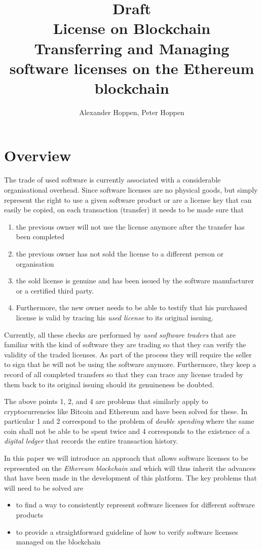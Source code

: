 \documentclass[a4paper]{article}
\title{\textsf{\Huge Draft} \\[3mm] License on Blockchain \\[2mm] \large Transferring and Managing software licenses on the Ethereum blockchain}
\author{Alexander Hoppen, Peter Hoppen}
\begin{document}
\maketitle



\section{Overview}

The trade of used software is currently associated with a considerable organisational overhead. Since software licenses are no physical goods, but simply represent the right to use a given software product or are a license key that can easily be copied, on each transaction (transfer) it needs to be made sure that
\begin{enumerate}
  \item the previous owner will not use the license anymore after the transfer has been completed
  \item the previous owner has not sold the license to a different person or organisation
  \item the sold license is genuine and has been issued by the software manufacturer or a certified third party.
  \item Furthermore, the new owner needs to be able to testify that his purchased license is valid by tracing his \emph{used license} to its original issuing.
\end{enumerate}

Currently, all these checks are performed by \emph{used software traders} that are familiar with the kind of software they are trading so that they can verify the validity of the traded licenses. As part of the process they will require the seller to sign that he will not be using the software anymore. Furthermore, they keep a record of all completed transfers so that they can trace any license traded by them back to its original issuing should its genuineness be doubted. 

The above points 1, 2, and 4 are problems that similarly apply to cryptocurrencies like Bitcoin and Ethereum and have been solved for these. In particular 1 and 2 correspond to the problem of \emph{double spending} where the same coin shall not be able to be spent twice and 4 corresponds to the existence of a \emph{digital ledger} that records the entire transaction history.

In this paper we will introduce an approach that allows software licenses to be represented on the \emph{Ethereum blockchain} and which will thus inherit the advances that have been made in the development of this platform. The key problems that will need to be solved are
\begin{itemize}
  \item to find a way to consistently represent software licenses for different software products
  \item to provide a straightforward guideline of how to verify software licenses managed on the blockchain
\end{itemize}
\end{document}
